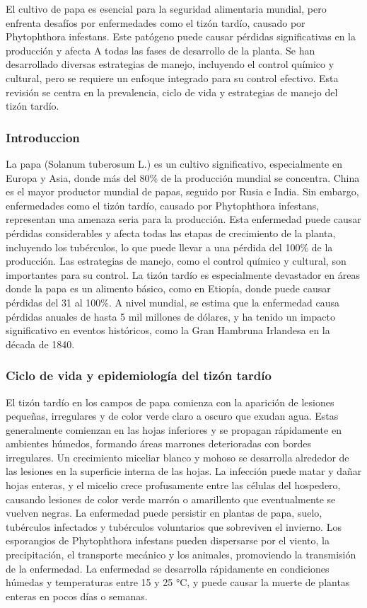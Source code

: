 El cultivo de papa es esencial para la seguridad alimentaria mundial, pero enfrenta desafíos por enfermedades como el tizón tardío, causado por Phytophthora infestans. Este patógeno puede causar pérdidas significativas en la producción y afecta A todas las fases de desarrollo de la planta. Se han desarrollado diversas estrategias de manejo, incluyendo el control químico y cultural, pero se requiere un enfoque integrado para su control efectivo. Esta revisión se centra en la prevalencia, ciclo de vida y estrategias de manejo del tizón tardío.
 
 \subsubsection{Introduccion}
 La papa (Solanum tuberosum L.) es un cultivo significativo, especialmente en Europa y Asia, donde más del 80\% de la producción mundial se concentra. China es el mayor productor mundial de papas, seguido por Rusia e India. Sin embargo, enfermedades como el tizón tardío, causado por Phytophthora infestans, representan una amenaza seria para la producción. Esta enfermedad puede causar pérdidas considerables y afecta todas las etapas de crecimiento de la planta, incluyendo los tubérculos, lo que puede llevar a una pérdida del 100\% de la producción. Las estrategias de manejo, como el control químico y cultural, son importantes para su control. La tizón tardío es especialmente devastador en áreas donde la papa es un alimento básico, como en Etiopía, donde puede causar pérdidas del 31 al 100\%. A nivel mundial, se estima que la enfermedad causa pérdidas anuales de hasta 5 mil millones de dólares, y ha tenido un impacto significativo en eventos históricos, como la Gran Hambruna Irlandesa en la década de 1840.
 
  \subsubsection{Ciclo de vida y epidemiología del tizón tardío}
  El tizón tardío en los campos de papa comienza con la aparición de lesiones pequeñas, irregulares y de color verde claro a oscuro que exudan agua. Estas generalmente comienzan en las hojas inferiores y se propagan rápidamente en ambientes húmedos, formando áreas marrones deterioradas con bordes irregulares. Un crecimiento miceliar blanco y mohoso se desarrolla alrededor de las lesiones en la superficie interna de las hojas. La infección puede matar y dañar hojas enteras, y el micelio crece profusamente entre las células del hospedero, causando lesiones de color verde marrón o amarillento que eventualmente se vuelven negras. La enfermedad puede persistir en plantas de papa, suelo, tubérculos infectados y tubérculos voluntarios que sobreviven el invierno. Los esporangios de Phytophthora infestans pueden dispersarse por el viento, la precipitación, el transporte mecánico y los animales, promoviendo la transmisión de la enfermedad. La enfermedad se desarrolla rápidamente en condiciones húmedas y temperaturas entre 15 y 25 °C, y puede causar la muerte de plantas enteras en pocos días o semanas.
  

